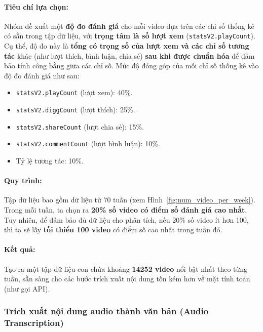 \paragraph{Tiêu chí lựa chọn:}
Nhóm đề xuất một \textbf{độ đo đánh giá} cho mỗi video dựa trên các chỉ số thống kê có sẵn trong tập dữ liệu, với \textbf{trọng tâm là số lượt xem} (\texttt{statsV2.playCount}). Cụ thể, độ đo này là \textbf{tổng có trọng số của lượt xem và các chỉ số tương tác} khác (như lượt thích, bình luận, chia sẻ) \textbf{sau khi được chuẩn hóa} để đảm bảo tính công bằng giữa các chỉ số. Mức độ đóng góp của mỗi chỉ số thống kê vào độ đo đánh giá như sau:
\begin{itemize}
    \item \texttt{statsV2.playCount} (lượt xem): 40\%.
    \item \texttt{statsV2.diggCount} (lượt thích): 25\%.
    \item \texttt{statsV2.shareCount} (lượt chia sẻ): 15\%.
    \item \texttt{statsV2.commentCount} (lượt bình luận): 10\%.
    \item Tỷ lệ tương tác: 10\%.
\end{itemize}

\paragraph{Quy trình:}
Tập dữ liệu bao gồm dữ liệu từ 70 tuần (xem Hình~\ref{fig:num_video_per_week}). Trong mỗi tuần, ta chọn ra \textbf{20\% số video có điểm số đánh giá cao nhất}. Tuy nhiên, để đảm bảo đủ dữ liệu cho phân tích, nếu 20\% số video ít hơn 100, thì ta sẽ lấy \textbf{tối thiểu 100 video} có điểm số cao nhất trong tuần đó.

\paragraph{Kết quả:}
Tạo ra một tập dữ liệu con chứa khoảng \textbf{14252 video} nổi bật nhất theo từng tuần, sẵn sàng cho các bước trích xuất nội dung tốn kém hơn về mặt tính toán (như gọi API).

\subsubsection{Trích xuất nội dung audio thành văn bản (Audio Transcription)} \label{subsubsec:transcript}

